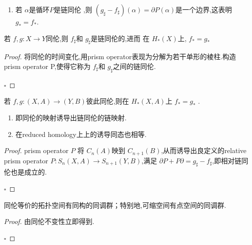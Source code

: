 \documentclass[../../几何与拓扑.tex]{subfiles}
\begin{document}
\begin{remark}
    \begin{enumerate}
        \item 若 \(  \alpha   \)是循环\(  P  \)是链同伦 ,则 \(  \left( g_{\sharp }-f_{\sharp } \right)  \left( \alpha  \right)=  \partial P\left( \alpha  \right)   \)是一个边界,这表明 \(  g_{*}= f_{*}  \).   
    \end{enumerate}
    
\end{remark}

\begin{theorem}
    若 \(  f,g:X\to Y  \)同伦,则 \(  f_{\sharp }  \)和 \(  g_{\sharp }  \)是链同伦的,进而 在 \(  H_{*}\left( X \right)   \)上, \(  f_{*}= g_{*}  \)     
\end{theorem}
\begin{proof}
    将同伦的时间变化,用prism operator表现为分解为若干单形的棱柱.构造prism operator P,使得它称为 \(  f_{\sharp }  \)和 \(  g_{\sharp }  \)之间的链同伦.  

    \hfill $\square$
\end{proof}
\begin{theorem}
    若 \(  f,g: \left( X,A \right)\to \left( Y,B \right)    \)彼此同伦,则在 \(  H_{*}\left( X,A \right)   \)上  \(  f_{*}= g_{*}  \)  .
\end{theorem}

\begin{remark}
    \begin{enumerate}
        \item 即同伦的映射诱导出链同伦的链映射.
        \item 在reduced homology上上的诱导同态也相等.
    \end{enumerate}
    
\end{remark}

\begin{proof}
    prism operator  \(  P  \) 将 \(  C_{n}\left( A \right)   \)映到 \(  C_{n+ 1}\left( B \right)   \),从而诱导出良定义的relative prism operator \(  P: S_{n}\left( X,A \right)\to S_{n+ 1}\left( Y,B \right)    \),满足 \(   \partial P+ P \partial = g_{\sharp }-f_{\sharp }  \),即相对链同伦也是成立的.    

    \hfill $\square$
\end{proof}

\begin{corollary}
    同伦等价的拓扑空间有同构的同调群；特别地,可缩空间有点空间的同调群.
\end{corollary}
\begin{proof}
    由同伦不变性立即得到.

    \hfill $\square$
\end{proof}
\end{document}

